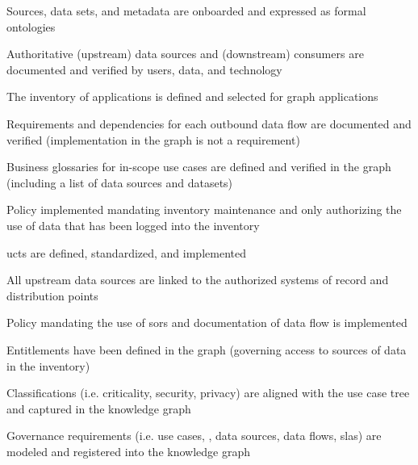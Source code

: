 \begin{scoring}

  \item Sources, data sets, and metadata are onboarded and expressed as formal ontologies
  \item Authoritative (upstream) data sources and (downstream) consumers are documented and verified by users,
        data, and technology
  \item The inventory of applications is defined and selected for graph applications
  \item Requirements and dependencies for each outbound data flow are documented and verified (implementation in the
        graph is not a requirement)
  \item Business glossaries for in-scope use cases are defined and verified in the graph (including a list of
        data sources and datasets)
  \item Policy implemented mandating inventory maintenance and only authorizing the use of data that has been logged
        into the inventory

\end{scoring}

\ekgmmscoringlevelTwo

\begin{scoring}

  \item \glspl{uct} are defined, standardized, and implemented
  \item All upstream data sources are linked to the authorized systems of record and distribution points
  \item Policy mandating the use of \glspl{sor} and documentation of data flow is implemented
  \item Entitlements have been defined in the graph (governing access to sources of data in the inventory)
  \item Classifications (i.e. criticality, security, privacy) are aligned with the use case tree and captured in the
        knowledge graph
  \item Governance requirements (i.e. use cases, , data sources, data flows, \glspl{sla})
        are modeled and registered into the knowledge graph

\end{scoring}

\ekgmmscoringlevelThree

